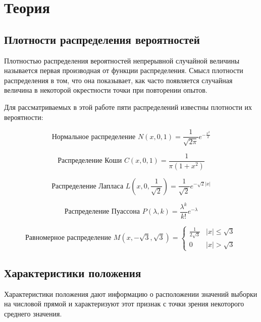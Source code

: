 \documentclass[a4]{article}
\begin{document}
\section{Теория}
\subsection{Плотности распределения вероятностей}

Плотностью распределения вероятностей непрерывной случайной величины называется первая производная от функции распределения. Смысл плотности распределения в том, что она показывает, как часто появляется случайная величина в некоторой окрестности точки при повторении опытов.

Для рассматриваемых в этой работе пяти распределений известны плотности их вероятности:

\begin{equation}\label{eqn:normal}
\text{Нормальное распределение } N(x,0,1) = \frac{1}{\sqrt{2\pi}}e^{-\frac{x^2}{2}}
\end{equation} 

\begin{equation}\label{eqn:cauchy}
\text{Распределение Коши } C(x,0,1) = \frac{1}{\pi(1+x^2)}
 \end{equation}
 
 \begin{equation}\label{eqn:laplace}
\text{Распределение Лапласа } L\left( x,0,\frac{1}{\sqrt{2}}\right) = \frac{1}{\sqrt{2}}e^{-\sqrt{2}\vert x\vert}
 \end{equation}
 
 \begin{equation}\label{eqn:poisson}
\text{Распределение Пуассона } P(\lambda,k) = \frac{\lambda^k}{k!}e^{-\lambda}
\end{equation}  

\begin{equation}\label{eqn:uniform}
\text{Равномерное распределение } M(x,-\sqrt{3}, \sqrt{3}) = 
 \begin{cases}
   \frac{1}{2\sqrt{3}} &\vert x\vert \leqslant \sqrt{3}\\
   0 &\vert x\vert > \sqrt{3}
 \end{cases}
\end{equation}

\subsection{Характеристики положения}
Характеристики положения дают информацию о расположении значений выборки на числовой прямой и характеризуют этот признак с точки зрения некоторого среднего значения.
\end{document}
